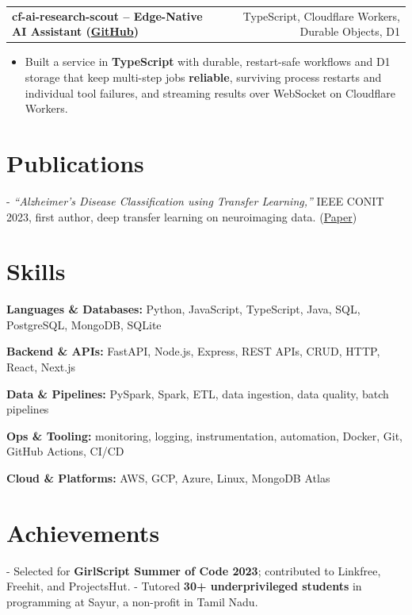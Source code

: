 \documentclass[letterpaper,11pt]{article}
\makeatletter
\newcommand{\projItem}[2]{%
  \vspace{6pt}
  \begin{tabular*}{\textwidth}{@{}l@{\extracolsep{\fill}}r@{}}
    \textbf{#1} & #2 \\
  \end{tabular*}\par\vspace{-2pt}
}
\newcommand{\skillLine}[2]{\textbf{#1:} #2\par\vspace{2pt}}
\newcommand{\inlineBlock}[1]{{\setlength{\leftskip}{0.18in}\small #1\par}}
\makeatother
\begin{document}
\projItem{cf-ai-research-scout -- Edge-Native AI Assistant {\normalfont\small(\href{https://github.com/Deva-1903/cf_ai_research_scout}{GitHub})}}{TypeScript, Cloudflare Workers, Durable Objects, D1}
\begin{itemize}
  \item Built a service in \textbf{TypeScript} with durable, restart-safe workflows and D1 storage that keep multi-step jobs \textbf{reliable}, surviving process restarts and individual tool failures, and streaming results over WebSocket on Cloudflare Workers.
\end{itemize}

\section{Publications}
\inlineBlock{- \textit{``Alzheimer's Disease Classification using Transfer Learning,''} IEEE CONIT 2023, first author, deep transfer learning on neuroimaging data. {\normalfont\small(\href{https://ieeexplore.ieee.org/document/10205760}{Paper})}}

\section{Skills}
\skillLine{Languages \& Databases}{Python, JavaScript, TypeScript, Java, SQL, PostgreSQL, MongoDB, SQLite}
\skillLine{Backend \& APIs}{FastAPI, Node.js, Express, REST APIs, CRUD, HTTP, React, Next.js}
\skillLine{Data \& Pipelines}{PySpark, Spark, ETL, data ingestion, data quality, batch pipelines}
\skillLine{Ops \& Tooling}{monitoring, logging, instrumentation, automation, Docker, Git, GitHub Actions, CI/CD}
\skillLine{Cloud \& Platforms}{AWS, GCP, Azure, Linux, MongoDB Atlas}

\section{Achievements}
\inlineBlock{- Selected for \textbf{GirlScript Summer of Code 2023}; contributed to Linkfree, Freehit, and ProjectsHut. - Tutored \textbf{30+ underprivileged students} in programming at Sayur, a non-profit in Tamil Nadu.}
\end{document}

